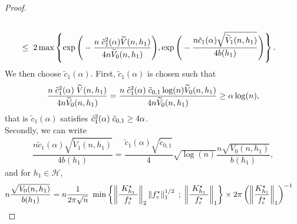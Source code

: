 \documentclass[11pt,a4paper,openany]{article}
\begin{document}
\begin{proof}
\begin{align}
	\\
	\leq & \hspace{0.2cm}  2 \max  \left\{   \exp \Bigg( - \dfrac{n  \hspace{0.1cm} \tilde c^2_{1}(\alpha)   \widetilde{V} (n , h_{1})  }{ 4 n \widetilde V_{0}(n, h_{1}) } \Bigg),  \exp \Bigg( - \dfrac{ n   \tilde c_{1}(\alpha) \sqrt{ \widetilde{V}_{1}(n , h_{1}) }  }{ 4 b(h_{1}) } \Bigg)  \right\}  . 
	\label{bernstein.inqua:byBerstein}
\end{align}
We then choose $\tilde c_{1}(\alpha)$. 
 First, $\tilde c_{1}(\alpha)$ is chosen such that 
\begin{align}
	\dfrac{n  \hspace{0.1cm} \tilde  c_{1}^2(\alpha)  \hspace{0.1cm}  \widetilde{V}(n , h_{1})  }{ 4 n \widetilde V_{0}(n, h_{1}) }  =  \dfrac{n  \hspace{0.1cm} \tilde c_{1}^2(\alpha)  \hspace{0.1cm} \tilde  c_{0,1} \log(n)\widetilde V_{0} (n , h_{1})  }{ 4 n \widetilde V_{0}(n, h_{1}) }  \geq  \alpha \log(n) , 
	\label{bernstein.inqua:maximize.1}
\end{align}
that is $\tilde c_{1}(\alpha)$ satisfies $\tilde c_{1}^2(\alpha) \hspace{0.1cm} \tilde c_{0,1} \geq 4 \alpha$.  
\\  
  Secondly, we  can write 
\begin{align*}
	\dfrac{ n   \tilde c_{1}(\alpha) \sqrt{ \widetilde{V}_{1}(n , h_{1}) }  }{ 4 b(h_{1}) }  =  \dfrac{ \tilde c_{1}(\alpha) \sqrt{\tilde c_{0,1}} }{4}  \sqrt{ \log(n) }   \dfrac{ n  \sqrt{ V_{0}(n , h_{1}) }}{ b(h_{1}) } , 
\end{align*}
and for $h_{1} \in \mathcal{H}$, 
\begin{align*}  
	n  \dfrac{  \sqrt{ V_{0}(n , h_{1}) }}{ b(h_{1}) }  
	&=  n  \dfrac{1}{ 2 \pi  \sqrt{n}  }  \hspace{0.1cm}  \min  \left\{    \left\| \dfrac{ \hspace{0.1cm}     K_{h_{1}}^{\star} \hspace{0.1cm}   }{ f_{\varepsilon}^{\star} }   \right\|_{2}  \left\| f_{\varepsilon}^{\star} \right\|_{1}^{1/2}     \hspace{0.1cm}   ;  \hspace{0.1cm}   \left\|  \dfrac{ \hspace{0.1cm}  K_{h_{1}}^{\star} \hspace{0.1cm}   }{f_{\varepsilon}^{\star}}    \right\|_{1}    \right\}  \times 2 \pi  \left( \left\| \dfrac{ K_{h_{1}}^{\star} }{ f_{\varepsilon}^{\star} } \right\|_{1}  \right)^{-1} 

\end{align*}
\end{proof}
\end{document}
